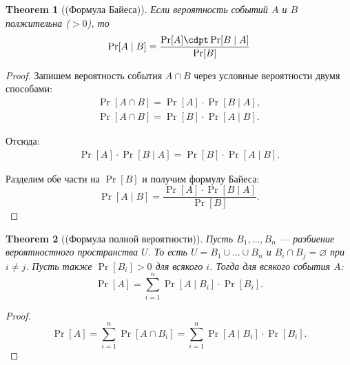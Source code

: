 \documentclass[a4paper]{article}
\theoremstyle{named}
\newtheorem*{namedtheorem}{Theorem}
\begin{document}
\begin{colloq}
        \begin{namedtheorem}[(Формула Байеса)]
            Если вероятность событий $A$ и $B$ полжительна ($> 0$), то
            \begin{equation*}
                \Pr[A \mid B] = \dfrac{\Pr[A] \cdpt \Pr[B \mid A]}{\Pr[B]}
            \end{equation*}
        \end{namedtheorem}

        \begin{proof}
            Запишем вероятность события $A \cap B$ через условные вероятности двумя способами:
            \[\begin{gathered}
                \Pr[A \cap B] = \Pr[A] \cdot \Pr[B \mid A], \\
                \Pr[A \cap B] = \Pr[B] \cdot \Pr[A \mid B].
            \end{gathered}\]

            Отсюда:
            \[\begin{gathered}
                \Pr[A] \cdot \Pr[B \mid A] = \Pr[B] \cdot \Pr[A \mid B].
            \end{gathered}\]

            Разделим обе части на $\Pr[B]$ и получим формулу Байеса:
            \begin{equation*}
                \Pr[A \mid B] = \dfrac{\Pr[A] \cdot \Pr[B \mid A]}{\Pr[B]}.
            \end{equation*}
        \end{proof}

        \begin{namedtheorem}[(Формула полной вероятности)]
            Пусть $B_1, \dots, B_n$ --- разбиение вероятностного пространства $U$. То есть $U = B_1 \cup \dots \cup B_n$ и $B_i \cap B_j = \varnothing$ при $i \neq j$. Пусть также $\Pr[B_i] > 0$ для всякого $i$. Тогда для всякого события $A$:
            \begin{equation*}
                \Pr[A] = \sum_{i = 1}^n \Pr[A \mid B_i] \cdot \Pr[B_i].
            \end{equation*}
        \end{namedtheorem}

        \begin{proof}
            \begin{equation*}
                \Pr[A] = \sum_{i = 1}^n \Pr[A \cap B_i] = \sum_{i = 1}^n \Pr[A \mid B_i] \cdot \Pr[B_i].
            \end{equation*}


\end{proof}
\end{colloq}
\end{document}

